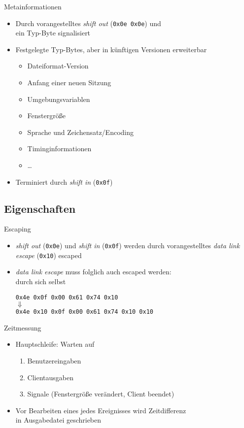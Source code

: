 \documentclass[ignorenonframetext,ucs]{beamer}
\begin{document}
\begin{frame}{Metainformationen}
\begin{itemize}
\item Durch vorangestelltes \emph{shift out} (\texttt{0x0e 0x0e}) und \\ ein Typ-Byte signalisiert
\item Festgelegte Typ-Bytes, aber in künftigen Versionen erweiterbar\begin{itemize}
\item Dateiformat-Version
\item Anfang einer neuen Sitzung
\item Umgebungsvariablen
\item Fenstergröße
\item Sprache und Zeichensatz/Encoding
\item Timinginformationen
\item …\end{itemize}
\item Terminiert durch \emph{shift in} (\texttt{0x0f})
\end{itemize}
\end{frame}

\subsection{Eigenschaften}

\begin{frame}{Escaping}
\begin{itemize}
\item \emph{shift out} (\texttt{0x0e}) und \emph{shift in} (\texttt{0x0f}) werden durch vorangestelltes \emph{data link escape} (\texttt{0x10}) escaped
\item \emph{data link escape} muss folglich auch escaped werden: \\ durch sich selbst
\begin{example}\begin{center}
\texttt{0x4e 0x0f 0x00 0x61 0x74 0x10}\\
$\Downarrow$\\
\texttt{0x4e 0x10 0x0f 0x00 0x61 0x74 0x10 0x10}
\end{center}\end{example}
\end{itemize}
\end{frame}

\begin{frame}{Zeitmessung}
\begin{itemize}
\item Hauptschleife: Warten auf\begin{enumerate}
\item Benutzereingaben
\item Clientausgaben
\item Signale (Fenstergröße verändert, Client beendet)\end{enumerate}
\item Vor Bearbeiten eines jedes Ereignisses wird Zeitdifferenz \\ in Ausgabedatei geschrieben
\end{itemize}
\end{frame}
\end{document}
